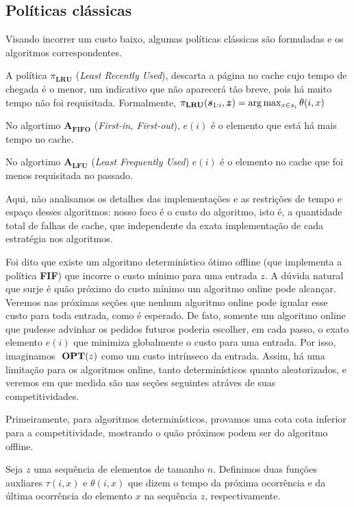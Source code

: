 \subsection{Políticas clássicas}

Visando incorrer um custo baixo, algumas políticas clássicas são formuladas e os algoritmos correspondentes.  

A política \(\pi_{\mathbf{LRU}}\) (\textit{Least Recently Used}), descarta a página no cache cujo tempo de chegada é o menor, um indicativo que não aparecerá tão breve, pois há muito tempo não foi requisitada. Formalmente, \( \pi_{\mathbf{LRU}} (\bm{s}_{1:i}, \bm{z}) = \arg {\max_{x \in s_i} \theta(i, x)}\)

No algortimo \(\mathbf{A_{FIFO}}\) (\textit{First-in, First-out}), \(e(i)\) é o elemento que está há mais tempo no cache. 

No algortimo \(\mathbf{A_{LFU}}\) (\textit{Least Frequently Used}) \(e(i)\) é o elemento no cache que foi menos requisitada no passado.

Aqui, não analisamos os detalhes das implementações e as restrições de tempo e espaço desses algoritmos: nosso foco é o custo do algoritmo, isto é, a quantidade total de falhas de cache, que independente da exata implementação de cada estratégia nos algoritmos.

Foi dito que existe um algoritmo determinístico ótimo offline (que implementa a política \textbf{FIF}) que incorre o custo mínimo para uma entrada \(z\). A dúvida natural que surje é quão próximo do custo mínimo um algoritmo online pode alcançar. Veremos nas próximas seções que nenhum algoritmo online pode igualar esse custo para toda entrada, como é esperado. De fato, somente um algoritmo online que pudesse advinhar os pedidos futuros poderia escolher, em cada passo, o exato elemento \(e(i)\) que minimiza globalmente o custo para uma entrada. Por isso, imaginamos \(\ \textbf{OPT}(z)\) como um custo intrínseco da entrada. Assim, há uma limitação para os algoritmos online, tanto determinísticos quanto aleatorizados, e veremos em que medida são nas seções seguintes atráves de suas competitividades.

Primeiramente, para algoritmos determinísticos, provamos uma cota cota inferior para a competitividade, mostrando o quão próximos podem ser do algoritmo offline. 

Seja \(z\) uma sequência de elementos de tamanho \(n\). Definimos duas funções auxliares \(\tau(i,x)\) e \(\theta(i,x)\) que dizem o tempo da próxima ocorrência e da última ocorrência do elemento \(x\) na sequência \(z\), respectivamente.


